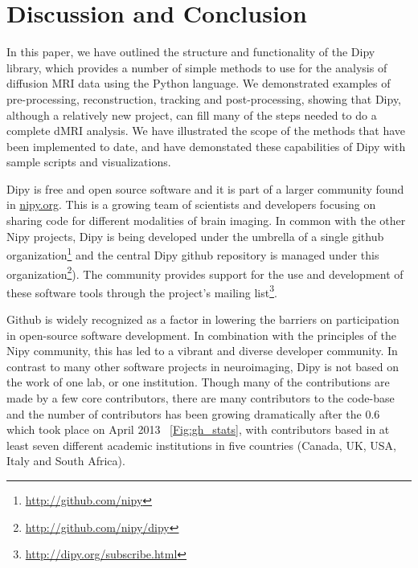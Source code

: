 \documentclass{bioinfo}
\begin{document}
\section{Discussion and Conclusion}

In this paper, we have outlined the structure and functionality of the Dipy library,
which provides a number of simple methods to use for the analysis of diffusion MRI data using the Python
language. We demonstrated examples of pre-processing, reconstruction, tracking and post-processing,
showing that Dipy, although a relatively new project, can fill many of the steps needed to do a complete 
dMRI analysis. We have illustrated the scope of the methods that have been implemented to date, and have 
demonstated these capabilities of Dipy with sample scripts and visualizations. 

Dipy is free and open source software and it is part of a larger community found in \url{nipy.org}. 
This is a growing team of scientists and developers focusing on sharing code for different modalities
of brain imaging. In common with the other Nipy projects, Dipy is being developed under the
umbrella of a single github organization\footnote{\url{http://github.com/nipy}} and the central
Dipy github repository is managed under this organization\footnote{\url{http://github.com/nipy/dipy}}).
The community provides support for the use and development of these software tools through 
the project's mailing list\footnote{\url{http://dipy.org/subscribe.html}}.

Github is widely recognized as a factor in lowering the barriers on
participation in open-source software development. In combination with
the principles of the Nipy community, this has led to a vibrant and diverse
developer community. In contrast to many other software projects in
neuroimaging, Dipy is not based on the work of one lab, or one institution. Though
many of the contributions are made by a few core contributors, there are many
contributors to the code-base and the number of contributors has been growing
dramatically after the 0.6 which took place on April 2013 ~\ref{Fig:gh_stats}, 
with contributors based in at least seven different academic
institutions in five countries (Canada, UK, USA, Italy and South Africa).
\end{document}
